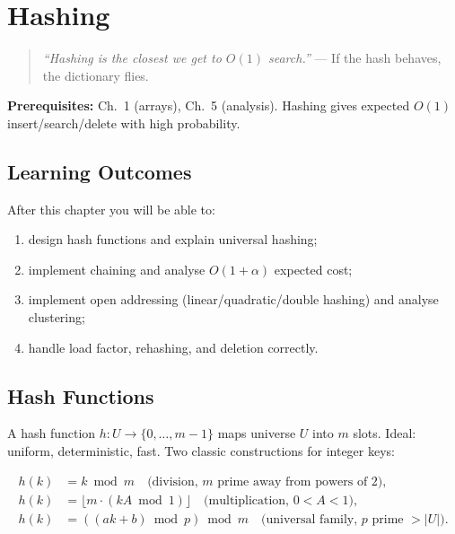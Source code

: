 \chapter{Hashing}
\label{ch:hashing}

\begin{quote}
\emph{``Hashing is the closest we get to $O(1)$ search.''} --- If the hash behaves, the dictionary flies.
\end{quote}

\noindent\textbf{Prerequisites:} Ch.~1 (arrays), Ch.~5 (analysis). Hashing gives expected $O(1)$ insert/search/delete with high probability.

\section*{Learning Outcomes}
After this chapter you will be able to:
\begin{enumerate}[label=(L\arabic*)]
    \item design hash functions and explain universal hashing;
    \item implement chaining and analyse $O(1+\alpha)$ expected cost;
    \item implement open addressing (linear/quadratic/double hashing) and analyse clustering;
    \item handle load factor, rehashing, and deletion correctly.
\end{enumerate}

\section{Hash Functions}
\label{sec:hash-functions}
A hash function $h:U\to\{0,\ldots,m-1\}$ maps universe $U$ into $m$ slots. Ideal: uniform, deterministic, fast. Two classic constructions for integer keys:

\begin{align}
h(k) &= k \bmod m \quad\text{(division, $m$ prime away from powers of 2)}, \nonumber\\
h(k) &= \lfloor m\cdot(kA\bmod 1)\rfloor \quad\text{(multiplication, $0<A<1$)}, \nonumber\\[4pt]
h(k) &= ((ak+b)\bmod p)\bmod m \quad\text{(universal family, $p$ prime $> |U|$)}. \nonumber
\end{align}

